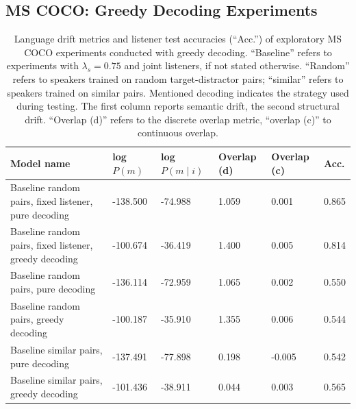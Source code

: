 \subsection{MS COCO: Greedy Decoding Experiments}
\label{expt:coco_greedy}
\begin{table}[]
	\begin{tabularx}{\linewidth}{|X|l|l|X|X|X|}
		\hline
			\textbf{Model name}                                    & \textbf{log $P(m)$} & \textbf{log $P(m \mid i)$} & \textbf{Overlap (d)} & \textbf{Overlap (c)} & \textbf{Acc. }  \\ \hline
			 Baseline random pairs, fixed listener, pure decoding   &     -138.500         &         -74.988               &       1.059            &      0.001               &       0.865       \\ \hline
			 Baseline random pairs, fixed listener, greedy decoding   &     -100.674     &         -36.419              &       1.400       &      0.005             &       0.814         \\ \hline
			 Baseline random pairs, pure decoding   & -136.114        &      -72.959            &       1.065          &      0.002               &       0.550       \\ \hline
			 Baseline random pairs, greedy decoding   &-100.187      &    -35.910            &       1.355          &      0.006            &       0.544       \\ \hline
			 Baseline similar pairs, pure decoding   &     -137.491& -77.898    & 0.198    &   -0.005    &  0.542        \\ \hline
			 Baseline similar pairs, greedy decoding   &   -101.436  &      -38.911        &     0.044   &     0.003     &  0.565           \\ \hline
			 
	\end{tabularx}
\caption{\label{tab:coco_greedy}Language drift metrics and listener test accuracies (``Acc.'') of exploratory MS COCO experiments conducted with greedy decoding. ``Baseline'' refers to experiments with $\lambda_s = 0.75$ and joint listeners, if not stated otherwise. ``Random'' refers to speakers trained on random target-distractor pairs; ``similar'' refers to speakers trained on similar pairs. Mentioned decoding indicates the strategy used during testing. The first column reports semantic drift, the second structural drift. ``Overlap (d)'' refers to the discrete overlap metric, ``overlap (c)'' to continuous overlap.}
\end{table}

